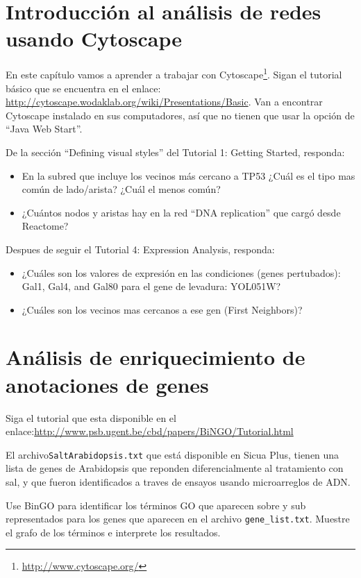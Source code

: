 \documentclass[letter,11pt]{book}
\begin{document}
\chapter{Introducción al análisis de redes usando Cytoscape}

En este capítulo vamos a aprender a trabajar con Cytoscape\footnote{\url{http://www.cytoscape.org/}}. Sigan el tutorial básico que se encuentra en el enlace: \url{http://cytoscape.wodaklab.org/wiki/Presentations/Basic}. Van a encontrar Cytoscape instalado en sus computadores, así que no tienen que usar la opción de ``Java Web Start''.

De la sección ``Defining visual styles'' del Tutorial 1: Getting Started, responda:

{\color{red}
\begin{itemize}
\item En la subred que incluye los vecinos más cercano a TP53 ¿Cuál es el tipo mas común de lado/arista? ¿Cuál el menos común?
\item ¿Cuántos nodos y aristas hay en la red ``DNA replication'' que cargó desde Reactome?
\end{itemize}
}

Despues de seguir el Tutorial 4: Expression Analysis, responda:

{\color{red}
\begin{itemize}
\item ¿Cuáles son los valores de expresión en las condiciones (genes pertubados): Gal1, Gal4, and Gal80 para el gene de levadura: YOL051W?
\item ¿Cuáles son los vecinos mas cercanos a ese gen (First Neighbors)?
\end{itemize}
}

\chapter{Análisis de enriquecimiento de anotaciones de genes}

Siga el tutorial que esta disponible en el enlace:\url{http://www.psb.ugent.be/cbd/papers/BiNGO/Tutorial.html}

El archivo\Verb+SaltArabidopsis.txt+ que está disponible en Sicua Plus, tienen una lista de genes de Arabidopsis que reponden diferencialmente al tratamiento con sal, y que fueron identificados a traves de ensayos usando microarreglos de ADN.

{\color{red}Use BinGO para identificar los términos GO que aparecen sobre y sub representados para los genes que aparecen en el archivo \Verb+gene_list.txt+. Muestre  el grafo de los términos e interprete los resultados.}
\end{document}
